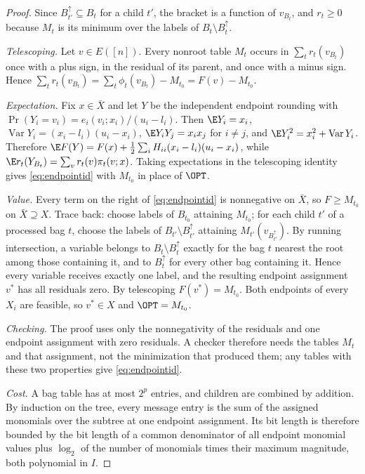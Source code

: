 \begin{proof}
Since $B_{t'}^{\uparrow}\subseteq B_t$ for a child $t'$, the bracket is a
function of $v_{B_t}$, and $r_t\ge0$ because $M_t$ is its minimum over the
labels of $B_t\setminus B_t^\uparrow$.

\emph{Telescoping.} Let $v\in E([n])$. Every nonroot table $M_t$ occurs in
$\sum_tr_t(v_{B_t})$ once with a plus sign, in the residual of its parent, and
once with a minus sign. Hence $\sum_tr_t(v_{B_t})=\sum_t\phi_t(v_{B_t})-M_{t_0}
=F(v)-M_{t_0}$.

\emph{Expectation.} Fix $x\in\bar X$ and let $Y$ be the independent endpoint
rounding with $\Pr(Y_i=v_i)=e_i(v_i;x_i)/(u_i-l_i)$. Then $\E Y_i=x_i$,
$\operatorname{Var}Y_i=(x_i-l_i)(u_i-x_i)$, $\E Y_iY_j=x_ix_j$ for $i\ne j$,
and $\E Y_i^2=x_i^2+\operatorname{Var}Y_i$. Therefore
$\E F(Y)=F(x)+\frac12\sum_iH_{ii}(x_i-l_i)(u_i-x_i)$, while
$\E r_t(Y_{B_t})=\sum_vr_t(v)\pi_t(v;x)$. Taking expectations in the
telescoping identity gives \eqref{eq:endpointid} with $M_{t_0}$ in place
of $\OPT$.

\emph{Value.} Every term on the right of \eqref{eq:endpointid} is
nonnegative on $\bar X$, so $F\ge M_{t_0}$ on $\bar X\supseteq X$. Trace back:
choose labels of $B_{t_0}$ attaining $M_{t_0}$; for each child $t'$ of a
processed bag $t$, choose the labels of $B_{t'}\setminus B_{t'}^\uparrow$
attaining $M_{t'}(v_{B_{t'}^\uparrow})$. By running intersection, a variable
belongs to $B_t\setminus B_t^\uparrow$ exactly for the bag $t$ nearest the
root among those containing it, and to $B_{t}^{\uparrow}$ for every other bag
containing it. Hence every variable receives exactly one label, and the
resulting endpoint assignment $v^*$ has all residuals zero. By telescoping
$F(v^*)=M_{t_0}$. Both endpoints of every $X_i$ are feasible, so $v^*\in X$
and $\OPT=M_{t_0}$.

\emph{Checking.} The proof uses only the nonnegativity of the residuals and
one endpoint assignment with zero residuals. A checker therefore needs the
tables $M_t$ and that assignment, not the minimization that produced them; any
tables with these two properties give \eqref{eq:endpointid}.

\emph{Cost.} A bag table has at most $2^p$ entries, and children are combined
by addition. By induction on the tree, every message entry is the sum of the
assigned monomials over the subtree at one endpoint assignment. Its bit length
is therefore bounded by the bit length of a common denominator of all endpoint
monomial values plus $\log_2$ of the number of monomials times their maximum
magnitude, both polynomial in $I$.
\end{proof}

